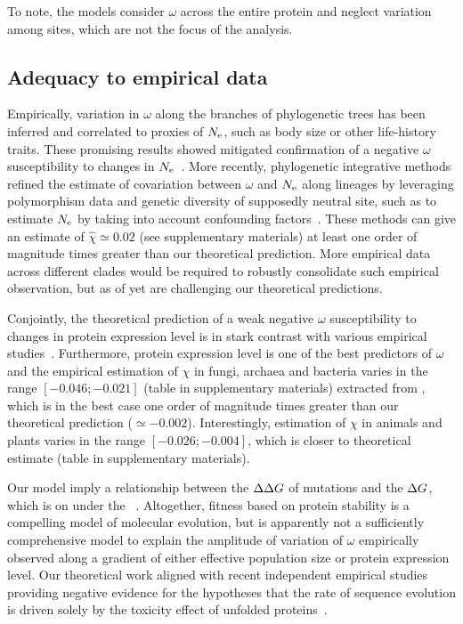 To note, the models consider $\omega$ across the entire protein and neglect variation among sites, which are not the focus of the analysis.

\subsection{Adequacy to empirical data}
Empirically, variation in $\omega$ along the branches of phylogenetic trees has been inferred and correlated to proxies of $N_{\mathrm{e}}$, such as body size or other life-history traits.
These promising results showed mitigated confirmation of a negative $\omega$ susceptibility to changes in $N_{\mathrm{e}}$~\citep{Lanfear2014}.
More recently, phylogenetic integrative methods refined the estimate of covariation between $\omega$ and $N_{\mathrm{e}}$ along lineages by leveraging polymorphism data and genetic diversity of supposedly neutral site, such as to estimate $N_{\mathrm{e}}$ by taking into account confounding factors~\citep{Brevet2019}.
These methods can give an estimate of $\hat{\chi} \simeq 0.02$ (see supplementary materials) at least one order of magnitude times greater than our theoretical prediction.
More empirical data across different clades would be required to robustly consolidate such empirical observation, but as of yet are challenging our theoretical predictions.

Conjointly, the theoretical prediction of a weak negative $\omega$ susceptibility to changes in protein expression level is in stark contrast with various empirical studies~\citep{Duret2000, Rocha2004, Wang2011, Song2017}.
Furthermore, protein expression level is one of the best predictors of $\omega$ and the empirical estimation of $\chi$ in fungi, archaea and bacteria varies in the range $[-0.046;-0.021]$ (table in supplementary materials) extracted from \citet{Zhang2015}, which is in the best case one order of magnitude times greater than our theoretical prediction ($\simeq -0.002$).
Interestingly, estimation of $\chi$ in animals and plants varies in the range $[-0.026;-0.004]$, which is closer to theoretical estimate (table in supplementary materials).

Our model imply a relationship between the $\Delta \Delta G$ of mutations and the $\Delta G$, which is on  under the ~\citep{Serohijos2012}.
Altogether, fitness based on protein stability is a compelling model of molecular evolution, but is apparently not a sufficiently comprehensive model to explain the amplitude of variation of $\omega$ empirically observed along a gradient of either effective population size or protein expression level.
Our theoretical work aligned with recent independent empirical studies providing negative evidence for the hypotheses that the rate of sequence evolution is driven solely by the toxicity effect of unfolded proteins~\citep{Plata2017,Razban2019,Biesiadecka2020}.

